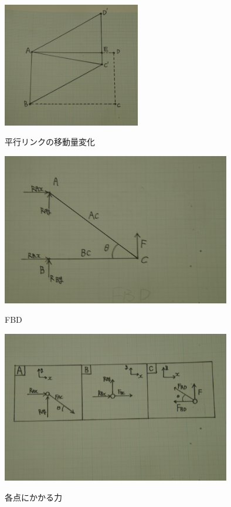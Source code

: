 \documentclass[11pt]{jsarticle}
\begin{document}
\begin{figure}[htbt]
 \begin{center}
  \includegraphics[width=60mm]{img/rink.jpg}
 　\caption{平行リンクの移動量変化}
  \label{fig:rink}%
 \end{center}
\end{figure}


\begin{figure}[htbt]
 \begin{center}
  \includegraphics[width=100mm]{img/fbd.jpg}
 　\caption{FBD}
  \label{fig:fbd}%
 \end{center}
\end{figure}


\begin{figure}[htbt]
 \begin{center}
  \includegraphics[width=100mm]{img/bai.jpg}
 　\caption{各点にかかる力}
  \label{fig:bai}%
 \end{center}
\end{figure}
\end{document}
